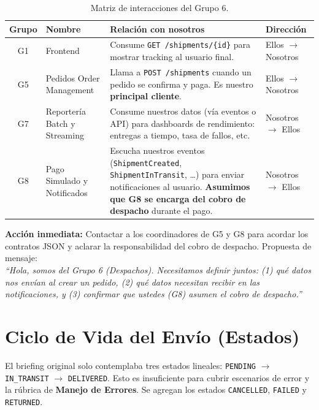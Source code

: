 \documentclass[11pt, a4paper]{article}
\begin{document}
\begin{table}[h!]
\centering
\renewcommand{\arraystretch}{1.4}
\begin{tabularx}{\textwidth}{c l X l}
  \toprule
  \textbf{Grupo} & \textbf{Nombre} & \textbf{Relación con nosotros} & \textbf{Dirección} \\
  \midrule
  G1 & Frontend & Consume \texttt{GET /shipments/\{id\}} para mostrar tracking al usuario final. & Ellos $\rightarrow$ Nosotros \\
  G5 & Pedidos Order Management & Llama a \texttt{POST /shipments} cuando un pedido se confirma y paga. Es nuestro \textbf{principal cliente}. & Ellos $\rightarrow$ Nosotros \\
  G7 & Reportería Batch y Streaming & Consume nuestros datos (vía eventos o API) para dashboards de rendimiento: entregas a tiempo, tasa de fallos, etc. & Nosotros $\rightarrow$ Ellos \\
  G8 & Pago Simulado y Notificados & Escucha nuestros eventos (\texttt{ShipmentCreated}, \texttt{ShipmentInTransit}, \dots) para enviar notificaciones al usuario. \textbf{Asumimos que G8 se encarga del cobro de despacho} durante el pago. & Nosotros $\rightarrow$ Ellos \\
  \bottomrule
\end{tabularx}
\caption{Matriz de interacciones del Grupo 6.}
\end{table}

\begin{tipbox}
  \textbf{Acción inmediata:} Contactar a los coordinadores de G5 y G8 para
  acordar los contratos JSON y aclarar la responsabilidad del cobro de despacho. Propuesta de mensaje:\\[0.3em]
  \textit{``Hola, somos del Grupo 6 (Despachos). Necesitamos definir juntos:
  (1) qué datos nos envían al crear un pedido, (2) qué datos necesitan
  recibir en las notificaciones, y (3) confirmar que ustedes (G8) asumen el cobro de despacho.''}
\end{tipbox}


\section{Ciclo de Vida del Envío (Estados)}
\label{sec:estados}

\begin{alertbox}[title={\faExclamationTriangle\quad Corrección: Estados faltantes}]
  El briefing original solo contemplaba tres estados lineales:
  \texttt{PENDING} $\rightarrow$ \texttt{IN\_TRANSIT} $\rightarrow$ \texttt{DELIVERED}.
  Esto es insuficiente para cubrir escenarios de error y la rúbrica de
  \textbf{Manejo de Errores}. Se agregan los estados \texttt{CANCELLED},
  \texttt{FAILED} y \texttt{RETURNED}.
\end{alertbox}
\end{document}
